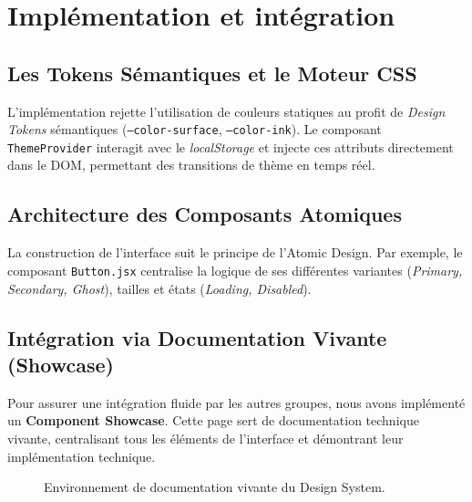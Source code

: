 \documentclass[12pt,a4paper]{report}
\begin{document}
\section{Implémentation et intégration}

\subsection{Les Tokens Sémantiques et le Moteur CSS}
L'implémentation rejette l'utilisation de couleurs statiques au profit de \textit{Design Tokens} sémantiques (\texttt{--color-surface}, \texttt{--color-ink}). Le composant \texttt{ThemeProvider} interagit avec le \textit{localStorage} et injecte ces attributs directement dans le DOM, permettant des transitions de thème en temps réel.

\subsection{Architecture des Composants Atomiques}
La construction de l'interface suit le principe de l'Atomic Design. Par exemple, le composant \texttt{Button.jsx} centralise la logique de ses différentes variantes (\textit{Primary, Secondary, Ghost}), tailles et états (\textit{Loading, Disabled}).

\subsection{Intégration via Documentation Vivante (Showcase)}
Pour assurer une intégration fluide par les autres groupes, nous avons implémenté un \textbf{Component Showcase}. Cette page sert de documentation technique vivante, centralisant tous les éléments de l'interface et démontrant leur implémentation technique.

\begin{figure}[H]
    \centering
    \caption{Environnement de documentation vivante du Design System.}
\end{figure}
\end{document}
